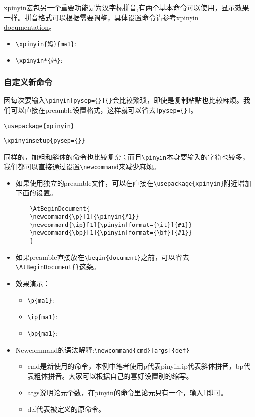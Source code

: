 \documentclass[a4paper,12pt]{article}
\begin{document}
xpinyin宏包另一个重要功能是为汉字标拼音,有两个基本命令可以使用，显示效果一样。拼音格式可以根据需要调整，具体设置命令请参考\href{https://ftp.snt.utwente.nl/pub/software/tex/macros/latex/contrib/xpinyin/xpinyin.pdf}{xpinyin documentation}。

\begin{itemize}
	\item \verb||: \xpinyin{妈}{ma1}
	\item \verb||: \xpinyin*{妈}
\end{itemize}


\subsubsection{自定义新命令}
因每次要输入\verb|\pinyin[pysep={}]{}|会比较繁琐，即使是复制粘贴也比较麻烦。我们可以直接在preamble设置格式，这样就可以省去\verb|[pysep={}]|。

\verb|\usepackage{xpinyin}|

\verb|\xpinyinsetup{pysep={}}|

\vspace{5mm}
同样的，加粗和斜体的命令也比较复杂；而且\verb|\pinyin|本身要输入的字符也较多，我们都可以直接通过设置\verb|\newcommand|来减少麻烦。

\begin{itemize}
	\item 如果使用独立的preamble文件，可以在直接在\verb|\usepackage{xpinyin}|附近增加下面的设置。	
	\begin{verbatim}
	\AtBeginDocument{
	\newcommand{\p}[1]{\pinyin{#1}}
	\newcommand{\ip}[1]{\pinyin[format={\it}]{#1}}
	\newcommand{\bp}[1]{\pinyin[format={\bf}]{#1}}
	}
	\end{verbatim}
	\item 如果preamble直接放在\verb|\begin{document}|之前，可以省去\verb|\AtBeginDocument{}|这条。
	\item 效果演示：
		\begin{itemize}
			\item \verb||: \p{ma1}
			\item \verb||: \ip{ma1}
			\item \verb||: \bp{ma1}
		\end{itemize}
	\item Newcommand的语法解释:\verb|\newcommand{cmd}[args]{def}|
		\begin{itemize}
			\item cmd是新使用的命令，本例中笔者使用p代表pinyin,ip代表斜体拼音，bp代表粗体拼音。大家可以根据自己的喜好设置别的缩写。
			\item args说明论元个数，在pinyin的命令里论元只有一个，输入1即可。
			\item def代表被定义的原命令。
		\end{itemize}
\end{itemize}
\end{document}
